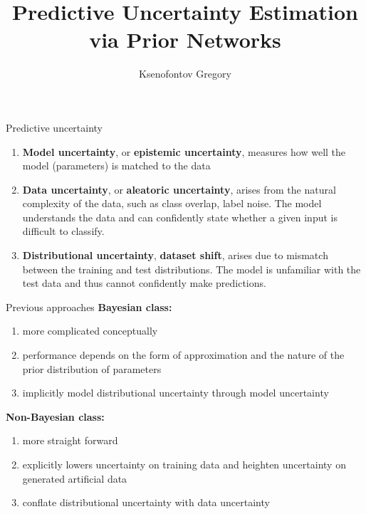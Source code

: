 \documentclass{beamer}
\title{Predictive Uncertainty Estimation via Prior Networks}
\author{Ksenofontov Gregory}
\institute{MIPT}
\begin{document}
\begin{frame}
    \titlepage
\end{frame}

\begin{frame}{Predictive uncertainty}
     \begin{enumerate}
        \item \textbf{Model uncertainty}, or \textbf{epistemic uncertainty}, measures how well the model (parameters) is matched to the data
        \item \textbf{Data uncertainty}, or \textbf{aleatoric uncertainty}, arises from the natural complexity of the data, such as class overlap, label noise. The model understands the data and can confidently state whether a given input is difficult to classify. 
        \item \textbf{Distributional uncertainty}, \textbf{dataset shift}, arises due to mismatch between the training and test distributions. The model is unfamiliar with the test data and thus cannot confidently make predictions. 
    \end{enumerate}
\end{frame}

\begin{frame}{Previous approaches}
\textbf{Bayesian class:} 
    \begin{enumerate}
        \item more complicated conceptually
        \item performance depends on the form of approximation and the nature of the prior distribution of parameters
        \item implicitly model distributional uncertainty through model uncertainty
    \end{enumerate}
    \textbf{Non-Bayesian class:}
    \begin{enumerate}
        \item more straight forward
        \item explicitly lowers uncertainty on training data and heighten uncertainty on generated artificial data
        \item conflate distributional uncertainty with data uncertainty
    \end{enumerate}
\end{frame}
\end{document}
